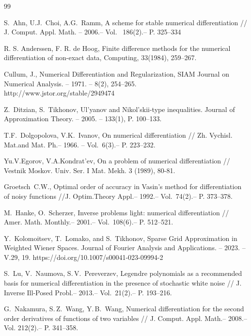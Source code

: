 \documentclass[10pt]{extarticle}
\begin{document}
\begin{thebibliography}{99}

S.~Ahn, U.J.~Choi,  A.G.~Ramm, A scheme for stable numerical differentiation
// J. Comput. Appl. Math. -- 2006.-- Vol.~
186(2).-- P. 325--334


 R. S. Anderssen, F. R. de Hoog,
Finite difference methods for the numerical differentiation of non-exact data,
Computing, 33(1984), 259--267.


 Cullum, J.,
Numerical Differentiation and Regularization,
SIAM Journal on Numerical Analysis. -- 1971. -- 8(2), 254--265.
http://www.jstor.org/stable/2949474

Z.~Ditzian, S.~Tikhonov,
Ul'yanov and Nikol'skii-type inequalities.
Journal of Approximation Theory. --
2005. -- 133(1), P. 100--133.

T.F.~Dolgopolova, V.K.~Ivanov,
On numerical differentiation
// Zh. Vychisl. Mat.and Mat. Ph.-- 1966. -- Vol.~6(3).-- P. 223--232.

Yu.V.Egorov, V.A.Kondrat'ev, On a problem of numerical differentiation // Vestnik Moskov. Univ. Ser. I Mat. Mekh. 3 (1989), 80-81.

Groetsch~C.W.,
Optimal order of accuracy in Vasin's method for differentiation of noisy functions
//J. Optim.Theory Appl.-- 1992.-- Vol.~74(2).-- P. 373--378.

M.~Hanke, O.~Scherzer,
Inverse problems light: numerical differentiation
//  Amer. Math. Monthly.-- 2001.-- Vol.~108(6).-- P. 512--521.

Y.~Kolomoitsev, T.~Lomako, and S.~Tikhonov,
Sparse Grid Approximation in Weighted Wiener Spaces.
Journal of Fourier Analysis and Applications. --
2023. -- V.29, 19.  https://doi.org/10.1007/s00041-023-09994-2

S.~Lu, V.~Naumova, S.\,V.~Pereverzev,
Legendre polynomials as a recommended basis for numerical differentiation in the
presence of stochastic white noise
// J. Inverse Ill-Posed Probl.-- 2013.-- Vol.~21(2).-- P. 193--216.

G.~Nakamura, S.\,Z.~Wang, Y.\,B.~Wang,
Numerical differentiation for the second order derivatives of functions of two variables
// J. Comput. Appl. Math.-- 2008.-- Vol.  212(2).-- P. 341--358.


\end{thebibliography}
\end{document}

